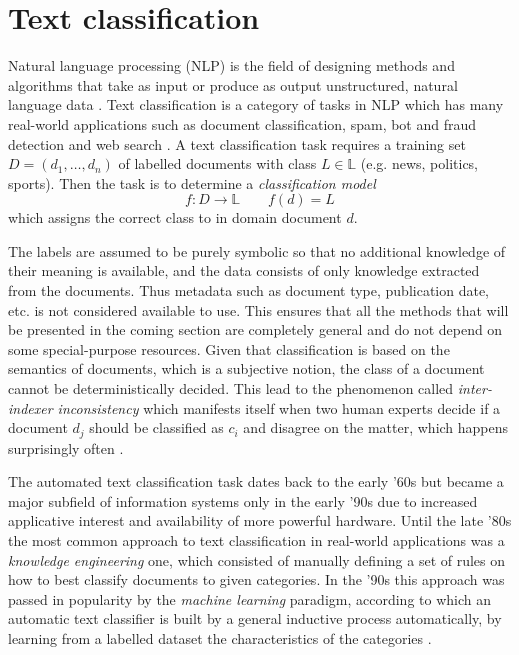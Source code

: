 \chapter{Text classification} \label{Text classification}

Natural language processing (NLP) is the field of designing methods and algorithms that take as input or produce as output unstructured, natural language data \cite{goldberg2017}.
Text classification is a category of tasks in NLP which has many real-world applications such as document classification, spam, bot and fraud detection and web search \cite{howard2018,joulin2016}.
A text classification task requires a training set $D = (d_1, \dots , d_n)$ of labelled documents with class $L \in \mathbb{L}$ (e.g. news, politics, sports). Then the task is to determine a \textit{classification model}
\begin{equation}
  f : D \rightarrow \mathbb{L}\qquad f(d) = L
\end{equation}
which assigns the correct class to in domain document $d$.
\cite{hotho}

The labels are assumed to be purely symbolic so that no additional knowledge of their meaning is available, and the data consists of only knowledge extracted from the documents. Thus metadata such as document type, publication date, etc. is not considered available to use.
This ensures that all the methods that will be presented in the coming section are completely general and do not depend on some special-purpose resources.
Given that classification is based on the semantics of documents, which is a subjective notion, the class of a document cannot be deterministically decided.
This lead to the phenomenon called \textit{inter-indexer inconsistency} which manifests itself when two human experts decide if a document $d_j$ should be classified as $c_i$ and disagree on the matter, which happens surprisingly often \cite{sebastiani2002}.

The automated text classification task dates back to the early '60s but became a major subfield of information systems only in the early '90s due to increased applicative interest and availability of more powerful hardware.
Until the late '80s the most common approach to text classification in real-world applications was a \textit{knowledge engineering} one, which consisted of manually defining a set of rules on how to best classify documents to given categories.
In the '90s this approach was passed in popularity by the \textit{machine learning} paradigm, according to which an automatic text classifier is built by a general inductive process automatically, by learning from a labelled dataset the characteristics of the categories \cite{sebastiani2002}.

